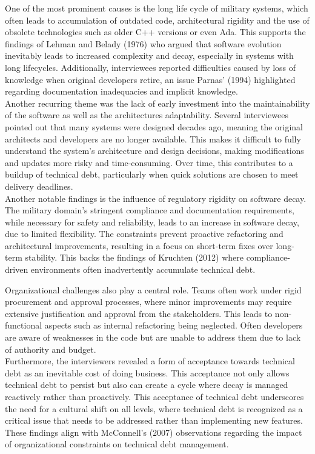 One of the most prominent causes is the long life cycle of military systems, which often leads to accumulation of outdated code, architectural rigidity and the use of obsolete technologies such as older C++ versions or even Ada.
This supports the findings of Lehman and Belady (1976) who argued that software evolution inevitably leads to increased complexity and decay, especially in systems with long lifecycles.
Additionally, interviewees reported difficulties caused by loss of knowledge when original developers retire, an issue Parnas' (1994) highlighted regarding documentation inadequacies and implicit knowledge.\\

Another recurring theme was the lack of early investment into the maintainability of the software as well as the architectures adaptability. Several interviewees pointed out that many systems were designed decades ago, meaning the original architects and developers are no longer available.
This makes it difficult to fully understand the system's architecture and design decisions, making modifications and updates more risky and time-consuming. Over time, this contributes to a buildup of technical debt, particularly when quick solutions are chosen to meet delivery deadlines.\\

Another notable findings is the influence of regulatory rigidity on software decay. The military domain's stringent compliance and documentation requirements, while necessary for safety and reliability, leads to an increase in software decay, due to limited flexibility.
The constraints prevent proactive refactoring and architectural improvements, resulting in a focus on short-term fixes over long-term stability. This backs the findings of Kruchten (2012) where compliance-driven environments often inadvertently accumulate technical debt.

Organizational challenges also play a central role. Teams often work under rigid procurement and approval processes, where minor improvements may require extensive justification and approval from the stakeholders. This leads to non-functional aspects such as internal refactoring being neglected.
Often developers are aware of weaknesses in the code but are unable to address them due to lack of authority and budget.\\
Furthermore, the interviewers revealed a form of acceptance towards technical debt as an inevitable cost of doing business. This acceptance not only allows technical debt to persist but also can create a cycle where decay is managed reactively rather than proactively.
This acceptance of technical debt underscores the need for a cultural shift on all levels, where technical debt is recognized as a critical issue that needs to be addressed rather than implementing new features. These findings align with McConnell's (2007) observations regarding 
the impact of organizational constraints on technical debt management.\\

